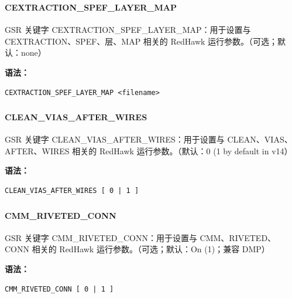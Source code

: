 \subsubsection{}
\paragraph*{CEXTRACTION_SPEF_LAYER_MAP}

GSR 关键字 CEXTRACTION_SPEF_LAYER_MAP：用于设置与 CEXTRACTION、SPEF、层、MAP 相关的 RedHawk 运行参数。（可选；默认：none）

\textbf{语法：}
\begin{lstlisting}
CEXTRACTION_SPEF_LAYER_MAP <filename>
\end{lstlisting}

\subsubsection{}
\paragraph*{CLEAN_VIAS_AFTER_WIRES}

GSR 关键字 CLEAN_VIAS_AFTER_WIRES：用于设置与 CLEAN、VIAS、AFTER、WIRES 相关的 RedHawk 运行参数。（默认：0 (1 by default in v14）

\textbf{语法：}
\begin{lstlisting}
CLEAN_VIAS_AFTER_WIRES [ 0 | 1 ]
\end{lstlisting}

\subsubsection{}
\paragraph*{CMM_RIVETED_CONN}

GSR 关键字 CMM_RIVETED_CONN：用于设置与 CMM、RIVETED、CONN 相关的 RedHawk 运行参数。（可选；默认：On (1)；兼容 DMP）

\textbf{语法：}
\begin{lstlisting}
CMM_RIVETED_CONN [ 0 | 1 ]
\end{lstlisting}

\subsubsection{}
